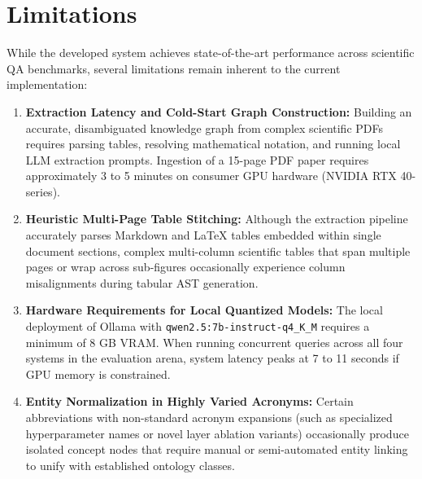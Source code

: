 \documentclass[12pt,a4paper,oneside]{report}
\begin{document}
\section{Limitations}
\label{sec:limitations}
While the developed system achieves state-of-the-art performance across scientific QA benchmarks, several limitations remain inherent to the current implementation:
\begin{enumerate}
    \item \textbf{Extraction Latency and Cold-Start Graph Construction:} Building an accurate, disambiguated knowledge graph from complex scientific PDFs requires parsing tables, resolving mathematical notation, and running local LLM extraction prompts. Ingestion of a 15-page PDF paper requires approximately 3 to 5 minutes on consumer GPU hardware (NVIDIA RTX 40-series).
    \item \textbf{Heuristic Multi-Page Table Stitching:} Although the extraction pipeline accurately parses Markdown and LaTeX tables embedded within single document sections, complex multi-column scientific tables that span multiple pages or wrap across sub-figures occasionally experience column misalignments during tabular AST generation.
    \item \textbf{Hardware Requirements for Local Quantized Models:} The local deployment of Ollama with \texttt{qwen2.5:7b-instruct-q4\_K\_M} requires a minimum of 8 GB VRAM. When running concurrent queries across all four systems in the evaluation arena, system latency peaks at 7 to 11 seconds if GPU memory is constrained.
    \item \textbf{Entity Normalization in Highly Varied Acronyms:} Certain abbreviations with non-standard acronym expansions (such as specialized hyperparameter names or novel layer ablation variants) occasionally produce isolated concept nodes that require manual or semi-automated entity linking to unify with established ontology classes.
\end{enumerate}
\end{document}
